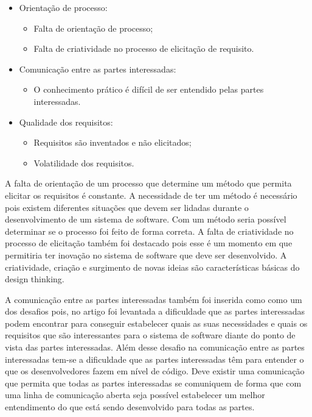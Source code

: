 \documentclass[a4paper,twoside]{article}
\begin{document}
\begin{itemize}
    \item Orientação de processo:
    \begin{itemize}
        \item Falta de orientação de processo;
        \item Falta de criatividade no processo de elicitação de requisito.
    \end{itemize}
    \item Comunicação entre as partes interessadas:
    \begin{itemize}
        \item O conhecimento prático é difícil de ser entendido pelas partes interessadas.
    \end{itemize}
    \item Qualidade dos requisitos:
    \begin{itemize}
        \item Requisitos são inventados e não elicitados;
        \item Volatilidade dos requisitos.
    \end{itemize}
\end{itemize}

A falta de orientação de um processo que determine um método que permita elicitar os requisitos é constante. A necessidade de ter um método é necessário pois existem diferentes situações que devem ser lidadas durante o desenvolvimento de um sistema de software. Com um método seria possível determinar se o processo foi feito de forma correta. A falta de criatividade no processo de elicitação também foi destacado pois esse é um momento em que permitiria ter inovação no sistema de software que deve ser desenvolvido. A criatividade, criação e surgimento de novas ideias são características básicas do design thinking\cite{DBLP:conf/sac/PereiraPPMC21}\cite{Definicao}.

A comunicação entre as partes interessadas também foi inserida como
como um dos desafios pois, no artigo \cite{DBLP:conf/sac/PereiraPPMC21} foi levantada a dificuldade que as partes interessadas podem encontrar para conseguir estabelecer quais as suas necessidades e quais os requisitos que são interessantes para o sistema de software diante do ponto de vista das partes interessadas.
Além desse desafio na comunicação entre as partes interessadas tem-se a dificuldade que as partes interessadas têm para entender o que os desenvolvedores fazem em nível de código. Deve existir uma comunicação que permita que todas as partes interessadas se comuniquem de forma que com uma linha de comunicação aberta seja possível estabelecer um melhor entendimento do que está sendo desenvolvido para todas as partes\cite{DBLP:conf/sac/PereiraPPMC21}.
\end{document}
